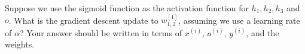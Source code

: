 \item {} Suppose we use the sigmoid function as the activation function for $h_1, h_2, h_3$ and $o$.
      What is the gradient descent update to $w_{1, 2}^{[1]}$, assuming we use a learning rate of $\alpha$?
      Your answer should be written in terms of $x^{(i)}$, $o^{(i)}$, $y^{(i)}$, and the weights.\\
      
\ifnum{} {
  
} \fi
